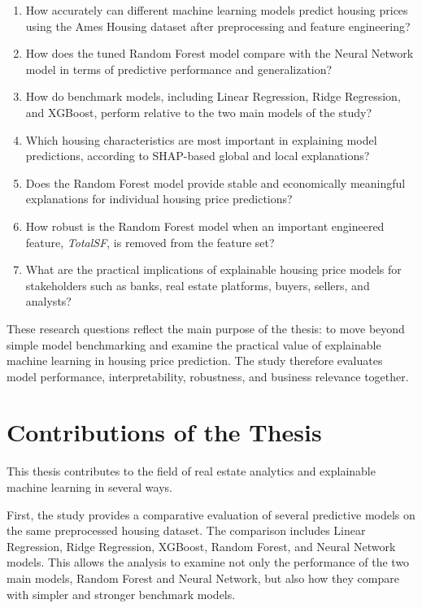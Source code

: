 \documentclass[12pt,a4paper,oneside,openany]{book}
\begin{document}
\begin{enumerate}
    \item How accurately can different machine learning models predict housing prices using the Ames Housing dataset after preprocessing and feature engineering?
    
    \item How does the tuned Random Forest model compare with the Neural Network model in terms of predictive performance and generalization?
    
    \item How do benchmark models, including Linear Regression, Ridge Regression, and XGBoost, perform relative to the two main models of the study?
    
    \item Which housing characteristics are most important in explaining model predictions, according to SHAP-based global and local explanations?
    
    \item Does the Random Forest model provide stable and economically meaningful explanations for individual housing price predictions?
    
    \item How robust is the Random Forest model when an important engineered feature, \textit{TotalSF}, is removed from the feature set?
    
    \item What are the practical implications of explainable housing price models for stakeholders such as banks, real estate platforms, buyers, sellers, and analysts?
\end{enumerate}

These research questions reflect the main purpose of the thesis: to move beyond simple model benchmarking and examine the practical value of explainable machine learning in housing price prediction. The study therefore evaluates model performance, interpretability, robustness, and business relevance together.

\section{Contributions of the Thesis}

This thesis contributes to the field of real estate analytics and explainable machine learning in several ways.

First, the study provides a comparative evaluation of several predictive models on the same preprocessed housing dataset. The comparison includes Linear Regression, Ridge Regression, XGBoost, Random Forest, and Neural Network models. This allows the analysis to examine not only the performance of the two main models, Random Forest and Neural Network, but also how they compare with simpler and stronger benchmark models.
\end{document}
